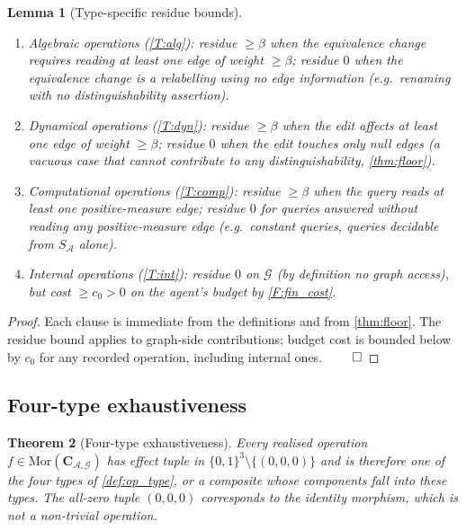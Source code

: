 \documentclass[11pt,twocolumn,a4paper]{article}
\theoremstyle{thmstyle}
\newtheorem{theorem}{Theorem}[section]
\newtheorem{lemma}[theorem]{Lemma}
\theoremstyle{definition}
\theoremstyle{remark}
\newcommand{\Graph}{\mathcal{G}}
\newcommand{\Agent}{\mathcal{A}}
\newcommand{\floor}{\beta}
\begin{document}
\begin{lemma}[Type-specific residue bounds]
\label{lem:type_residues}
\begin{enumerate}[nosep,leftmargin=*]
\item Algebraic operations (\ref{T:alg}): residue $\geq \floor$
when the equivalence change requires reading at least one edge of
weight $\geq \floor$; residue $0$ when the equivalence change is a
relabelling using no edge information (e.g.~renaming with no
distinguishability assertion).
\item Dynamical operations (\ref{T:dyn}): residue $\geq \floor$
when the edit affects at least one edge of weight $\geq \floor$;
residue $0$ when the edit touches only null edges (a vacuous case
that cannot contribute to any distinguishability,
\cref{thm:floor}).
\item Computational operations (\ref{T:comp}): residue $\geq \floor$
when the query reads at least one positive-measure edge; residue
$0$ for queries answered without reading any positive-measure edge
(e.g.~constant queries, queries decidable from $S_\Agent$ alone).
\item Internal operations (\ref{T:int}): residue $0$ on $\Graph$
(by definition no graph access), but cost $\geq c_0 > 0$ on the
agent's budget by \cref{F:fin_cost}.
\end{enumerate}
\end{lemma}

\begin{proof}
Each clause is immediate from the definitions and from
\cref{thm:floor}. The residue bound applies to graph-side
contributions; budget cost is bounded below by $c_0$ for any
recorded operation, including internal ones. $\qed$
\end{proof}

\subsection{Four-type exhaustiveness}

\begin{theorem}[Four-type exhaustiveness]
\label{thm:three_types}
Every realised operation $f \in \mathrm{Mor}(\mathbf{C}_{\Agent,
\Graph})$ has effect tuple in
$\{0,1\}^3 \setminus \{(0,0,0)\}$ and is therefore one of the four
types of \cref{def:op_type}, or a composite whose components fall
into these types. The all-zero tuple $(0,0,0)$ corresponds to the
identity morphism, which is not a non-trivial operation.
\end{theorem}
\end{document}
